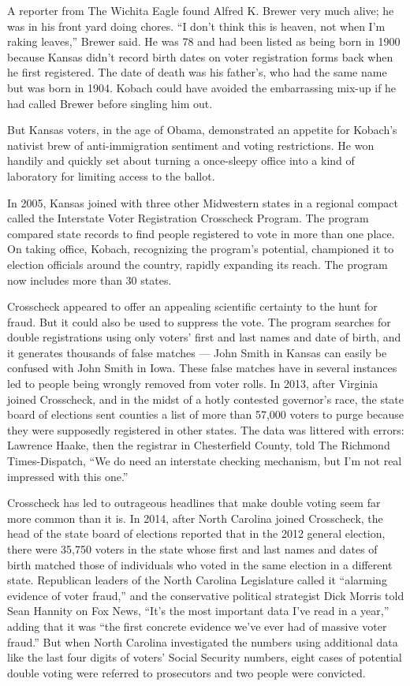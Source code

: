 A reporter from The Wichita Eagle found Alfred K. Brewer very much
alive; he was in his front yard doing chores. ``I don't think this is
heaven, not when I'm raking leaves,'' Brewer said. He was 78 and had
been listed as being born in 1900 because Kansas didn't record birth
dates on voter registration forms back when he first registered. The
date of death was his father's, who had the same name but was born in
1904. Kobach could have avoided the embarrassing mix-up if he had called
Brewer before singling him out.

But Kansas voters, in the age of Obama, demonstrated an appetite for
Kobach's nativist brew of anti-immigration sentiment and voting
restrictions. He won handily and quickly set about turning a once-sleepy
office into a kind of laboratory for limiting access to the ballot.

In 2005, Kansas joined with three other Midwestern states in a regional
compact called the Interstate Voter Registration Crosscheck Program. The
program compared state records to find people registered to vote in more
than one place. On taking office, Kobach, recognizing the program's
potential, championed it to election officials around the country,
rapidly expanding its reach. The program now includes more than 30
states.

Crosscheck appeared to offer an appealing scientific certainty to the
hunt for fraud. But it could also be used to suppress the vote. The
program searches for double registrations using only voters' first and
last names and date of birth, and it generates thousands of false
matches --- John Smith in Kansas can easily be confused with John Smith
in Iowa. These false matches have in several instances led to people
being wrongly removed from voter rolls. In 2013, after Virginia joined
Crosscheck, and in the midst of a hotly contested governor's race, the
state board of elections sent counties a list of more than 57,000 voters
to purge because they were supposedly registered in other states. The
data was littered with errors: Lawrence Haake, then the registrar in
Chesterfield County, told The Richmond Times-Dispatch, ``We do need an
interstate checking mechanism, but I'm not real impressed with this
one.''

Crosscheck has led to outrageous headlines that make double voting seem
far more common than it is. In 2014, after North Carolina joined
Crosscheck, the head of the state board of elections reported that in
the 2012 general election, there were 35,750 voters in the state whose
first and last names and dates of birth matched those of individuals who
voted in the same election in a different state. Republican leaders of
the North Carolina Legislature called it ``alarming evidence of voter
fraud,'' and the conservative political strategist Dick Morris told Sean
Hannity on Fox News, ``It's the most important data I've read in a
year,'' adding that it was ``the first concrete evidence we've ever had
of massive voter fraud.'' But when North Carolina investigated the
numbers using additional data like the last four digits of voters'
Social Security numbers, eight cases of potential double voting were
referred to prosecutors and two people were convicted.


